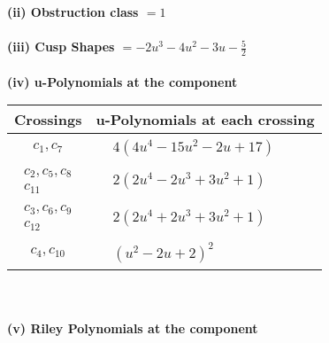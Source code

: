 \documentclass[1p]{elsarticle_modified}
\theoremstyle{definition}
\begin{document}
\flushleft \textbf{(ii) Obstruction class $= 1$}\\~\\
\flushleft \textbf{(iii) Cusp Shapes $= -2 u^3-4 u^2-3 u-\frac{5}{2}$}\\~\\
\newpage\renewcommand{\arraystretch}{1}
\flushleft \textbf{(iv) u-Polynomials at the component}\newline \\
\begin{tabular}{m{50pt}|m{274pt}}
Crossings & \hspace{64pt}u-Polynomials at each crossing \\
\hline $$\begin{aligned}c_{1},c_{7}\end{aligned}$$&$\begin{aligned}
&4(4 u^4-15 u^2-2 u+17)
\end{aligned}$\\
\hline $$\begin{aligned}c_{2},c_{5},c_{8}\\c_{11}\end{aligned}$$&$\begin{aligned}
&2(2 u^4-2 u^3+3 u^2+1)
\end{aligned}$\\
\hline $$\begin{aligned}c_{3},c_{6},c_{9}\\c_{12}\end{aligned}$$&$\begin{aligned}
&2(2 u^4+2 u^3+3 u^2+1)
\end{aligned}$\\
\hline $$\begin{aligned}c_{4},c_{10}\end{aligned}$$&$\begin{aligned}
&(u^2-2 u+2)^2
\end{aligned}$\\
\hline
\end{tabular}\\~\\
\newpage\renewcommand{\arraystretch}{1}
\flushleft \textbf{(v) Riley Polynomials at the component}\newline \\
\end{document}
